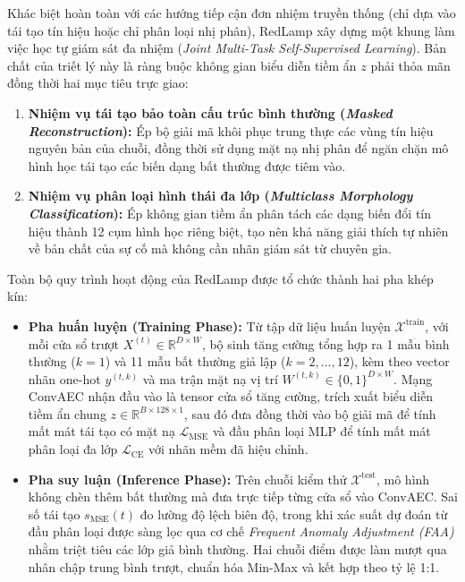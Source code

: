 \documentclass[sigconf,nonacm]{acmart}
\begin{document}
Khác biệt hoàn toàn với các hướng tiếp cận đơn nhiệm truyền thống (chỉ dựa vào tái tạo tín hiệu hoặc chỉ phân loại nhị phân), RedLamp xây dựng một khung làm việc học tự giám sát đa nhiệm (\textit{Joint Multi-Task Self-Supervised Learning}). Bản chất của triết lý này là ràng buộc không gian biểu diễn tiềm ẩn $z$ phải thỏa mãn đồng thời hai mục tiêu trực giao:
\begin{enumerate}[leftmargin=*, itemsep=2pt, parsep=0pt]
    \item \textbf{Nhiệm vụ tái tạo bảo toàn cấu trúc bình thường (\textit{Masked Reconstruction}):} Ép bộ giải mã khôi phục trung thực các vùng tín hiệu nguyên bản của chuỗi, đồng thời sử dụng mặt nạ nhị phân để ngăn chặn mô hình học tái tạo các biến dạng bất thường được tiêm vào.
    \item \textbf{Nhiệm vụ phân loại hình thái đa lớp (\textit{Multiclass Morphology Classification}):} Ép không gian tiềm ẩn phân tách các dạng biến đổi tín hiệu thành 12 cụm hình học riêng biệt, tạo nên khả năng giải thích tự nhiên về bản chất của sự cố mà không cần nhãn giám sát từ chuyên gia.
\end{enumerate}

Toàn bộ quy trình hoạt động của RedLamp được tổ chức thành hai pha khép kín:
\begin{itemize}[leftmargin=*, itemsep=2pt, parsep=0pt]
    \item \textbf{Pha huấn luyện (Training Phase):} Từ tập dữ liệu huấn luyện $\mathcal{X}^{\text{train}}$, với mỗi cửa sổ trượt $X^{(t)} \in \mathbb{R}^{D \times W}$, bộ sinh tăng cường tổng hợp ra 1 mẫu bình thường ($k=1$) và 11 mẫu bất thường giả lập ($k=2, \dots, 12$), kèm theo vector nhãn one-hot $y^{(t,k)}$ và ma trận mặt nạ vị trí $W^{(t,k)} \in \{0, 1\}^{D \times W}$. Mạng ConvAEC nhận đầu vào là tensor cửa sổ tăng cường, trích xuất biểu diễn tiềm ẩn chung $z \in \mathbb{R}^{B \times 128 \times 1}$, sau đó đưa đồng thời vào bộ giải mã để tính mất mát tái tạo có mặt nạ $\mathcal{L}_{\text{MSE}}$ và đầu phân loại MLP để tính mất mát phân loại đa lớp $\mathcal{L}_{\text{CE}}$ với nhãn mềm đã hiệu chỉnh.
    \item \textbf{Pha suy luận (Inference Phase):} Trên chuỗi kiểm thử $\mathcal{X}^{\text{test}}$, mô hình không chèn thêm bất thường mà đưa trực tiếp từng cửa sổ vào ConvAEC. Sai số tái tạo $s_{\text{MSE}}(t)$ đo lường độ lệch biên độ, trong khi xác suất dự đoán từ đầu phân loại được sàng lọc qua cơ chế \textit{Frequent Anomaly Adjustment (FAA)} nhằm triệt tiêu các lớp giả bình thường. Hai chuỗi điểm được làm mượt qua nhân chập trung bình trượt, chuẩn hóa Min-Max và kết hợp theo tỷ lệ 1:1.
\end{itemize}
\end{document}

